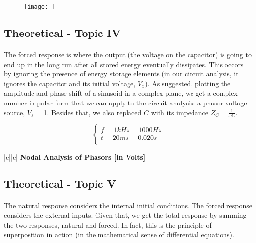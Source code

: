 \begin{figure}[H] \centering
\texttt{[image: ]}
\caption{}
\label{}
\end{figure}



 
\subsection{Theoretical - Topic IV}
\label{subsec:fourth_topic}

\paragraph{}
The forced response is where the output (the voltage on the capacitor) is going to end up in the long run after all stored energy eventually dissipates. This occors by ignoring the presence of energy storage elements (in our circuit analysis, it ignores the capacitor and its initial voltage, $V_x$). As suggested, plotting the amplitude and phase shift of a sinusoid in a complex plane, we get a complex number in polar form that we can apply to the circuit analysis: a phasor voltage source, $V_s$ = 1. Besides that, we also replaced $C$ with its impedance $Z_C=\frac{1}{\omega C}$.


\[
\left\{\begin{matrix}
f = 1 kHz = 1000 Hz \\
t = 20 ms = 0.020 s \\
\end{matrix}\right.
\]


\begin{center}
   \begin{tabular}{|c||c|}
      \hline    
       {\bf Nodal Analysis of Phasors [in Volts]} \\
      \hline
        
   \end{tabular}
 \end{center}
 
\subsection{Theoretical - Topic V}
\label{subsec:fifth_topic}

\paragraph{}
The natural response considers the internal initial conditions. The forced response considers the external inputs. Given that, we get the total response by summing the two responses, natural and forced. In fact, this is the principle of superposition in action (in the mathematical sense of differential equations).

